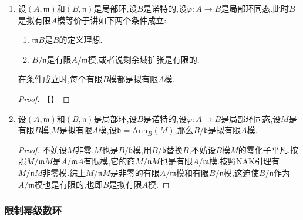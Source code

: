 \begin{enumerate}
\begin{proof}
    	这件事是因为$A$是完备诺特局部环,$M$是$A$上拟有限并且$\mathfrak{m}$-adic可分的,我们解释过这些条件推出$M$是有限$A$模.
    \end{proof}
    \item 设$(A,\mathfrak{m})$和$(B,\mathfrak{n})$是局部环,设$B$是诺特的,设$\varphi:A\to B$是局部环同态.此时$B$是拟有限$A$模等价于讲如下两个条件成立:
    \begin{enumerate}[(1)]
    	\item $\mathfrak{m}B$是$B$的定义理想.
    	\item $B/\mathfrak{n}$是有限$A/\mathfrak{m}$模,或者说剩余域扩张是有限的.
    \end{enumerate}

    在条件成立时,每个有限$B$模都是拟有限$A$模.
    \begin{proof}
    	
    	【】
    \end{proof}
    \item 设$(A,\mathfrak{m})$和$(B,\mathfrak{n})$是局部环,设$B$是诺特的,设$\varphi:A\to B$是局部环同态,设$M$是有限$B$模,$M$是拟有限$A$模,设$\mathfrak{b}=\mathrm{Ann}_B(M)$,那么$B/\mathfrak{b}$是拟有限$A$模.
    \begin{proof}
    	
    	不妨设$M$非零.$M$也是$B/\mathfrak{b}$模,用$B/\mathfrak{b}$替换$B$,不妨设$B$模$M$的零化子平凡.按照$M/\mathfrak{m}M$是$A/\mathfrak{m}A$有限模,它的商$M/\mathfrak{n}M$也是有限$A/\mathfrak{m}$模.按照NAK引理有$M/\mathfrak{n}M$非零模.综上$M/\mathfrak{n}M$是非零的有限$A/\mathfrak{m}$模和有限$B/\mathfrak{n}$模,这迫使$B/\mathfrak{n}$作为$A/\mathfrak{m}$模也是有限的,也即$B$是拟有限$A$模.
    \end{proof}
\end{enumerate}
\subsubsection{限制幂级数环}

